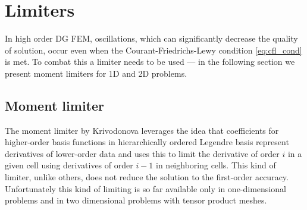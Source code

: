 \newpage
\section{Limiters}
\label{se:limiters}
In high order DG FEM, oscillations, which can significantly decrease the quality of
solution, occur even when the Courant-Friedrichs-Lewy condition \eqref{eq:cfl_cond} is met.
To combat this a limiter needs to be used --- in the following section we present moment
limiters for 1D and
2D problems.

\subsection{Moment limiter}
The moment limiter by Krivodonova \cite{Krivodonova2007} leverages the idea that
coefficients for higher-order basis functions in hierarchically ordered
Legendre basis represent derivatives of lower-order data and uses this to
limit the derivative of order $i$ in a given cell using derivatives of order
$i - 1$ in neighboring cells. This kind of limiter, unlike others, does not
reduce the solution to the first-order accuracy. Unfortunately this kind of
limiting is so far available only in one-dimensional problems and in two
dimensional problems with tensor product meshes.

